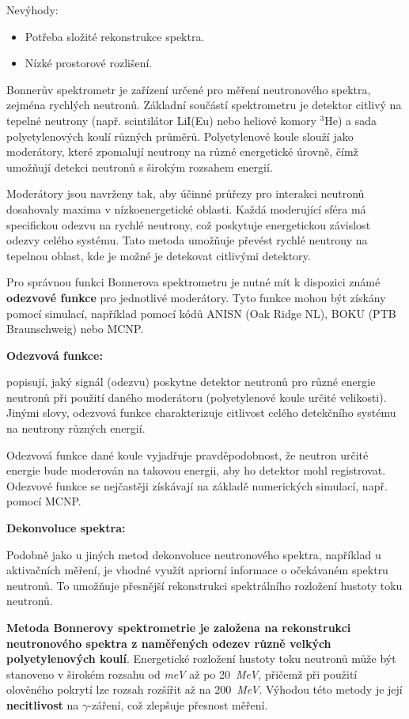 Nevýhody:

\begin{itemize}
    \item Potřeba složité rekonstrukce spektra.
    \item Nízké prostorové rozlišení.
\end{itemize}

Bonnerův spektrometr je zařízení určené pro měření neutronového spektra, zejména rychlých neutronů. Základní součástí spektrometru je detektor citlivý na tepelné neutrony (např. scintilátor LiI(Eu) nebo heliové komory $^3$He) a sada polyetylenových koulí různých průměrů. Polyetylenové koule slouží jako moderátory, které zpomalují neutrony na různé energetické úrovně, čímž umožňují detekci neutronů s širokým rozsahem energií.

Moderátory jsou navrženy tak, aby účinné průřezy pro interakci neutronů dosahovaly maxima v nízkoenergetické oblasti. Každá moderující sféra má specifickou odezvu na rychlé neutrony, což poskytuje energetickou závislost odezvy celého systému. Tato metoda umožňuje převést rychlé neutrony na tepelnou oblast, kde je možné je detekovat citlivými detektory.

Pro správnou funkci Bonnerova spektrometru je nutné mít k dispozici známé \textbf{odezvové funkce} pro jednotlivé moderátory. Tyto funkce mohou být získány pomocí simulací, například pomocí kódů ANISN (Oak Ridge NL), BOKU (PTB Braunschweig) nebo MCNP.

\textbf{Odezvová funkce:}

popisují, jaký signál (odezvu) poskytne detektor neutronů pro různé energie neutronů při použití daného moderátoru (polyetylenové koule určité velikosti). Jinými slovy, odezvová funkce charakterizuje citlivost celého detekčního systému na neutrony různých energií.

Odezvová funkce dané koule vyjadřuje pravděpodobnost, že neutron určité energie bude moderován na takovou energii, aby ho detektor mohl registrovat. Odezvové funkce se nejčastěji získávají na základě numerických simulací, např. pomocí MCNP.

\textbf{Dekonvoluce spektra:}

Podobně jako u jiných metod dekonvoluce neutronového spektra, například u aktivačních měření, je vhodné využít apriorní informace o očekávaném spektru neutronů. To umožňuje přesnější rekonstrukci spektrálního rozložení hustoty toku neutronů.

\textbf{Metoda Bonnerovy spektrometrie je založena na rekonstrukci neutronového spektra z naměřených odezev různě velkých polyetylenových koulí}. Energetické rozložení hustoty toku neutronů může být stanoveno v širokém rozsahu od \textit{meV} až po 20~\textit{MeV}, přičemž při použití olověného pokrytí lze rozsah rozšířit až na 200~\textit{MeV}. Výhodou této metody je její \textbf{necitlivost} na $\gamma$-záření, což zlepšuje přesnost měření.

